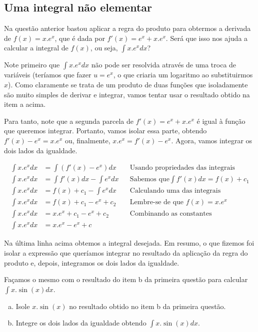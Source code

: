 \documentclass[main_estudante.tex]{subfiles}
\begin{document}
\subsection*{Uma integral não elementar}

Na questão anterior bastou aplicar a regra do produto para obtermos a derivada de $f(x)=x . e^x$, que é dada por $f'(x)=e^x+x.e^x$. Será que isso nos ajuda a calcular a integral de $f(x)$, ou seja, $\int x . e^x dx$?

Note primeiro que $\int x . e^x dx$ não pode ser resolvida através de uma troca de variáveis (teríamos que fazer $u=e^x$, o que criaria um logaritmo ao substituirmos $x$). Como claramente se trata de um produto de duas funções que isoladamente são muito simples de derivar e integrar, vamos tentar usar o resultado obtido na item a acima.

Para tanto, note que a segunda parcela de $f'(x)=e^x+x.e^x$ é igual à função que queremos integrar. Portanto, vamos isolar essa parte, obtendo $f'(x)-e^x=x.e^x$ ou, finalmente, $x.e^x=f'(x)-e^x$. Agora, vamos integrar os dois lados da igualdade.

\begin{align*}
\int x.e^x dx &= \int (f'(x)-e^x) dx && \text{Usando propriedades das integrais}\\
\int x.e^x dx &= \int f'(x) dx - \int e^x dx && \text{Sabemos que} \int f'(x) dx = f(x)+c_1 \\
\int x.e^x dx &= f(x)+c_1 - \int e^x dx && \text{Calculando uma das integrais}\\
\int x.e^x dx &= f(x)+c_1 - e^x+c_2 && \text{Lembre-se de que } f(x)=x . e^x\\
\int x.e^x dx &= x . e^x+c_1 - e^x+c_2 && \text{Combinando as constantes} \\
\int x.e^x dx &= x . e^x - e^x+c
\end{align*}

Na última linha acima obtemos a integral desejada. Em resumo, o que fizemos foi isolar a expressão que queríamos integrar no resultado da aplicação da regra do produto e, depois, integramos os dois lados da igualdade.


\begin{questao}
Façamos o mesmo com o resultado do item b da primeira questão para calcular $\int x . \sin(x) dx$.
\begin{enumerate}[a)]
\item Isole $x . \sin(x)$ no resultado obtido no item b da primeira questão.
\item Integre os dois lados da igualdade obtendo $\int x . \sin(x) dx$.
\end{enumerate}
\end{questao}
\end{document}
